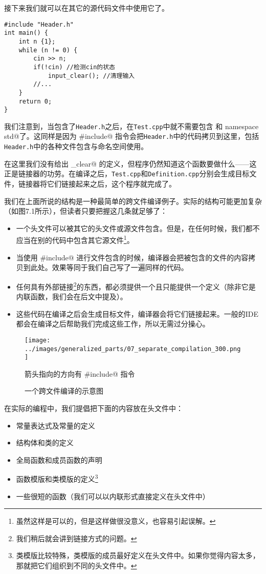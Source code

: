 接下来我们就可以在其它的源代码文件中使用它了。
\begin{lstlisting}[caption=\texttt{Test.cpp}]
#include "Header.h"
int main() {
    int n {1};
    while (n != 0) {
        cin >> n;
        if(!cin) //检测cin的状态
            input_clear(); //清理输入
        //...
    }
    return 0;
}
\end{lstlisting}
我们注意到，当包含了\texttt{Header.h}之后，在\texttt{Test.cpp}中就不需要包含 \lstinline@iostream@ 和 \lstinline@using namespace std@了。这同样是因为 \lstinline@#include@ 指令会把\texttt{Header.h}中的代码拷贝到这里，包括\texttt{Header.h}中的各种文件包含与命名空间使用。\par
在这里我们没有给出 \lstinline@input_clear@ 的定义，但程序仍然知道这个函数要做什么——这正是链接器的功劳。在编译之后，\texttt{Test.cpp}和\texttt{Definition.cpp}分别会生成目标文件，链接器将它们链接起来之后，这个程序就完成了。\par
我们在上面所说的结构是一种最简单的跨文件编译例子。实际的结构可能更加复杂（如图7.1所示），但读者只要把握这几条就足够了：
\begin{itemize}
    \item 一个头文件可以被其它的头文件或源文件包含。但是，在任何时候，我们都不应当在别的代码中包含其它源文件\footnote{虽然这样是可以的，但是这样做很没意义，也容易引起误解。}。
    \item 当使用 \lstinline@#include@ 进行文件包含的时候，编译器会把被包含的文件的内容拷贝到此处。效果等同于我们自己写了一遍同样的代码。
    \item 任何具有外部链接\footnote{我们稍后就会讲到链接方式的问题。}的东西，都必须提供一个且只能提供一个定义（除非它是内联函数，我们会在后文中提及）。
    \item 这些代码在编译之后会生成目标文件，编译器会将它们链接起来。一般的IDE都会在编译之后帮助我们完成这些工作，所以无需过分操心。
\end{itemize}
\begin{figure}[htbp]
    \centering
    \texttt{[image: ../images/generalized\_parts/07\_separate\_compilation\_300.png]}
    \caption{一个跨文件编译的示意图}
    \footnotesize{箭头指向的方向有 \lstinline@#include@ 指令}
\end{figure}
在实际的编程中，我们提倡把下面的内容放在头文件中：
\begin{itemize}
    \item 常量表达式及常量的定义
    \item 结构体和类的定义
    \item 全局函数和成员函数的声明
    \item 函数模版和类模版的定义\footnote{类模版比较特殊，类模版的成员最好定义在头文件中。如果你觉得内容太多，那就把它们组织到不同的头文件中。}
    \item 一些很短的函数（我们可以以内联形式直接定义在头文件中）
\end{itemize}
